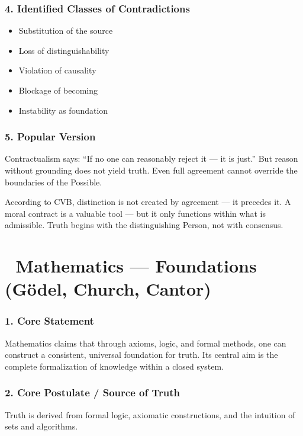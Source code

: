 \documentclass[12pt]{article}
\begin{document}
\subsubsection*{4. Identified Classes of Contradictions}

\begin{itemize}
\item Substitution of the source
\item Loss of distinguishability
\item Violation of causality
\item Blockage of becoming
\item Instability as foundation
\end{itemize}

\subsubsection*{5. Popular Version}

Contractualism says: ``If no one can reasonably reject it — it is just.'' But reason without grounding does not yield truth. Even full agreement cannot override the boundaries of the Possible.

According to CVB, distinction is not created by agreement — it precedes it. A moral contract is a valuable tool — but it only functions within what is admissible. Truth begins with the distinguishing Person, not with consensus.

\section*{🔷 Mathematics — Foundations (Gödel, Church, Cantor)}

\subsubsection*{1. Core Statement}

Mathematics claims that through axioms, logic, and formal methods, one can construct a consistent, universal foundation for truth. Its central aim is the complete formalization of knowledge within a closed system.

\subsubsection*{2. Core Postulate / Source of Truth}

Truth is derived from formal logic, axiomatic constructions, and the intuition of sets and algorithms.
\end{document}
